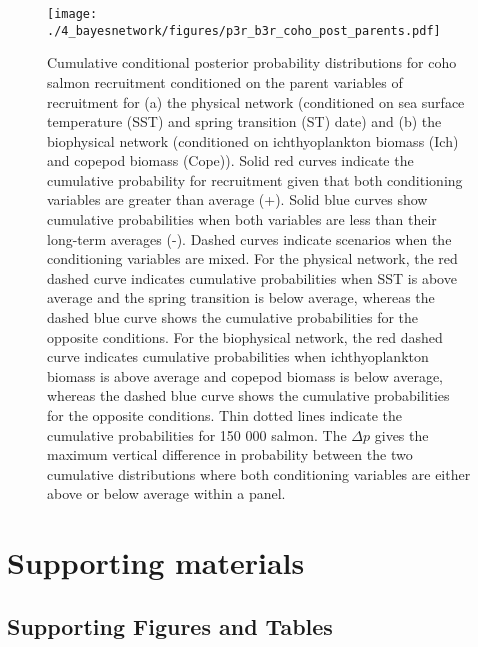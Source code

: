 \begin{figure}[htbp]
  \centering \texttt{[image: ./4\_bayesnetwork/figures/p3r\_b3r\_coho\_post\_parents.pdf]}
  \caption[Cumulative conditional posterior probability distributions for coho
           salmon recruitment conditioned on the parent variables of
           recruitment.]{Cumulative conditional posterior probability
           distributions for coho salmon recruitment conditioned on the parent
           variables of recruitment for (a) the physical network (conditioned on
           sea surface temperature (SST) and spring transition (ST) date) and
           (b) the biophysical network (conditioned on ichthyoplankton biomass
           (Ich) and copepod biomass (Cope)). Solid red curves indicate
           the cumulative probability for recruitment given that both
           conditioning variables are greater than average (+). Solid
           blue curves show cumulative probabilities when both variables are
           less than their long-term averages (-). Dashed curves indicate
           scenarios when the conditioning variables are mixed. For the physical
           network, the red dashed curve indicates cumulative probabilities
           when SST is above average and the spring transition is below average,
           whereas the dashed blue curve shows the cumulative probabilities for
           the opposite conditions. For the biophysical network, the red dashed
           curve indicates cumulative probabilities when ichthyoplankton biomass
           is above average and copepod biomass is below average, whereas the
           dashed blue curve shows the cumulative probabilities for the
           opposite conditions. Thin dotted lines indicate the cumulative
           probabilities for 150 000 salmon.  The \(\Delta p\) gives the maximum
           vertical difference in probability between the two cumulative
           distributions where both conditioning variables are either above or
           below average within a panel.}
  \label{fig:bn:8}
\end{figure}
\newpage



\section{Supporting materials}

\subsection{Supporting Figures and Tables}


